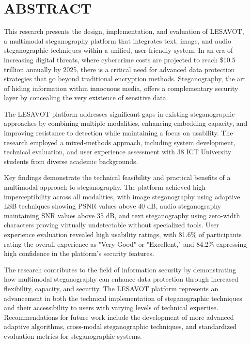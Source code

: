 \documentclass[12pt, a4paper, oneside]{book}
\begin{document}
\chapter{ABSTRACT}

This research presents the design, implementation, and evaluation of LESAVOT, a multimodal steganography platform that integrates text, image, and audio steganographic techniques within a unified, user-friendly system. In an era of increasing digital threats, where cybercrime costs are projected to reach \$10.5 trillion annually by 2025, there is a critical need for advanced data protection strategies that go beyond traditional encryption methods. Steganography, the art of hiding information within innocuous media, offers a complementary security layer by concealing the very existence of sensitive data.

The LESAVOT platform addresses significant gaps in existing steganographic approaches by combining multiple modalities, enhancing embedding capacity, and improving resistance to detection while maintaining a focus on usability. The research employed a mixed-methods approach, including system development, technical evaluation, and user experience assessment with 38 ICT University students from diverse academic backgrounds.

Key findings demonstrate the technical feasibility and practical benefits of a multimodal approach to steganography. The platform achieved high imperceptibility across all modalities, with image steganography using adaptive LSB techniques showing PSNR values above 40 dB, audio steganography maintaining SNR values above 35 dB, and text steganography using zero-width characters proving virtually undetectable without specialized tools. User experience evaluation revealed high usability ratings, with 81.6\% of participants rating the overall experience as "Very Good" or "Excellent," and 84.2\% expressing high confidence in the platform's security features.

The research contributes to the field of information security by demonstrating how multimodal steganography can enhance data protection through increased flexibility, capacity, and security. The LESAVOT platform represents an advancement in both the technical implementation of steganographic techniques and their accessibility to users with varying levels of technical expertise. Recommendations for future work include the development of more advanced adaptive algorithms, cross-modal steganographic techniques, and standardized evaluation metrics for steganographic systems.
\end{document}
